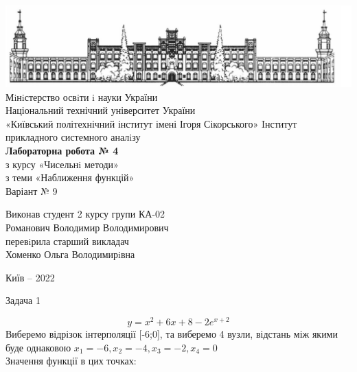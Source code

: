 \documentclass[14 pt]{extarticle}
\begin{document}
\begin{titlepage}
    \begin{center}
        
        \includegraphics[width=18cm]{image1.png}
        Мiнiстерство освiти i науки України \\
        Національний технічний університет України \\
        «Київський політехнічний інститут імені Ігоря Сікорського» Iнститут прикладного системного аналiзу \\

        \vspace{4.5cm}
        \textbf{Лабораторна робота № 4}\\
        з курсу «Чисельнi методи» \\
        з теми «Наближення функцій» \\
        Варіант № 9 \\
    \end{center}

    \vspace{2cm}

    \begin{flushright}
        Виконав студент 2 курсу групи КА-02 \\
        Романович Володимир Володимирович \\
        перевiрила старший викладач \\
        Хоменко Ольга Володимирiвна \\

    \end{flushright}

    \vfill
    \begin{center}
        Київ -- 2022
    \end{center}
\end{titlepage}
\begin{center}
    \Large
    Задача 1
\end{center}
$$
    y = x^2+6x+8-2e^{x+2}
$$
Виберемо відрізок інтерполяції [-6;0], та виберемо 4 вузли, відстань між якими буде однаковою $x_1 = -6, x_2 = -4, x_3 = -2, x_4 = 0$
\\Значення функції в цих точках: \\ 
\end{document}
